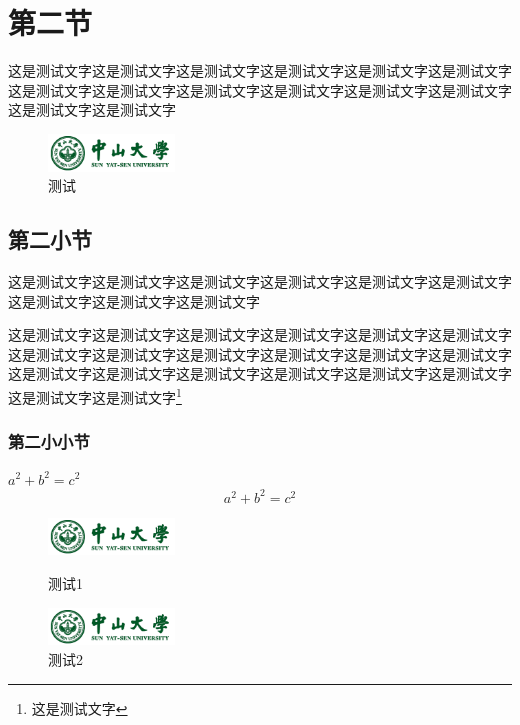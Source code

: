 \documentclass[UTF8]{ctexart}
\begin{document}
\section{第二节}
这是测试文字这是测试文字这是测试文字这是测试文字这是测试文字这是测试文字这是测试文字这是测试文字这是测试文字这是测试文字这是测试文字这是测试文字这是测试文字这是测试文字
\begin{figure}[htbp]
	\centering
	\includegraphics [width=0.3\textwidth]{logo.png}
	\caption{测试}
\end{figure}
\subsection{第二小节}
\par 这是测试文字这是测试文字这是测试文字这是测试文字这是测试文字这是测试文字这是测试文字这是测试文字这是测试文字
\par 这是测试文字这是测试文字这是测试文字这是测试文字这是测试文字这是测试文字这是测试文字这是测试文字这是测试文字这是测试文字这是测试文字这是测试文字这是测试文字这是测试文字这是测试文字这是测试文字这是测试文字这是测试文字这是测试文字这是测试文字\footnote{这是测试文字}

\subsubsection{第二小小节}
\par $a^2+b^2=c^2$
\[
a^2+b^2=c^2
\]
\begin{figure}[htbp]
	\centering
	\begin{minipage}[c]{0.5\textwidth}
		\centering
		\includegraphics[width=0.3\textwidth]{logo.png}
		\caption{测试1}
	\end{minipage}%
	\begin{minipage}[c]{0.5\textwidth}
		\centering
		\includegraphics[width=0.3\textwidth]{logo.png}
		\caption{测试2}
	\end{minipage}
\end{figure}
\end{document}
